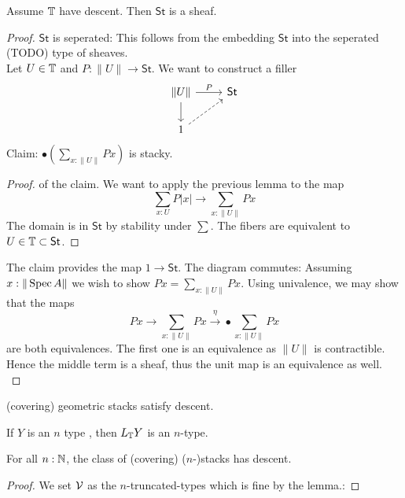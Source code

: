\documentclass{article}
\newcommand{\St}{\mathsf{St}}
\begin{document}
\begin{theorem}
	Assume $\mathbb{T}$ have descent. Then $\St$ is a sheaf.
\end{theorem}
\begin{proof}
	$\St$ is seperated: This follows from the embedding $\St$ into the seperated (TODO) type of sheaves. \\
	Let $U \in \mathbb{T}$ and $P : \|U\| \to \St$. We want to construct a filler 
	\[\begin{tikzcd}
		{\| U\|} & \St \\
		1
		\arrow["P", from=1-1, to=1-2]
		\arrow[from=1-1, to=2-1]
		\arrow[dashed, from=2-1, to=1-2]
	\end{tikzcd}\]
	Claim: $\bullet (\sum_{x: \|U\|} P x)$ is stacky.
	\begin{proof} of the claim. We want to apply the previous lemma to the map 
		\[\sum_{x : U} P | x | \to \sum_{x : \| U\|} P x \]
		The domain is in $\St$ by stability under $\sum$. The fibers are equivalent to $U \in \bT \subset \St$.				
	\end{proof}
    The claim provides the map $1 \to \St$. The diagram commutes: Assuming $x : \|\operatorname{Spec} A\|$ we wish to show $P x = \sum_{x: \|U\|} P x$. Using univalence, we may show that the maps 
	\[P x \to \sum_{x: \|U\|} P x \overset{\eta}{\to} \bullet \sum_{x: \|U\|} P x\]
	are both equivalences.
	The first one is an equivalence as $\|U\|$ is contractible. Hence the middle term is a sheaf, thus the unit map is an equivalence as well. \\
	
	
	
\end{proof}
\begin{corollary}
	(covering) geometric stacks satisfy descent.
\end{corollary}
\begin{lemma}[TODO]
	If $Y$ is an $n$ type , then $L_{\mathbb{T}} Y$ is an $n$-type.
\end{lemma}
\begin{corollary}
	For all $n : \mathbb{N} $, the class of (covering) ($n$-)stacks has descent.
\end{corollary}
\begin{proof}
 We set $\mathcal{V}$ as the $n$-truncated-types which is fine by the lemma.: %
\end{proof}
\end{document}
